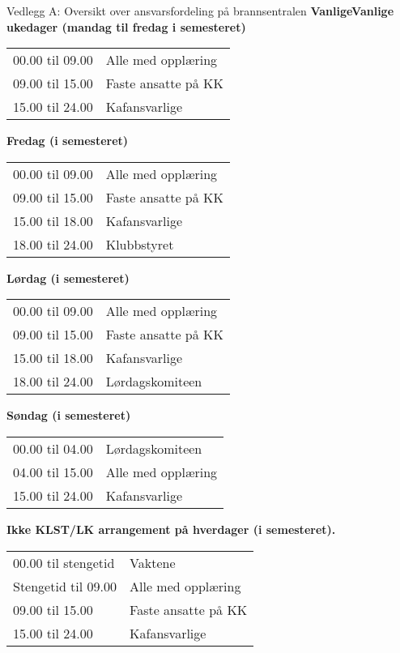 \begin{instruks}{Vedlegg A: Oversikt over ansvarsfordeling på brannsentralen}{}{}
    \textbf{VanligeVanlige ukedager (mandag til fredag i semesteret)}

    \begin{tabular}{ll}
        00.00 til 09.00 &    Alle med opplæring \\
        09.00 til 15.00 &    Faste ansatte på KK\\
        15.00 til 24.00 &    Kafansvarlige 
    \end{tabular}

    
    \textbf{Fredag (i semesteret)}
    
    \begin{tabular}{ll}
        00.00 til 09.00 &Alle med opplæring \\
        09.00 til 15.00 &Faste ansatte på KK\\
        15.00 til 18.00 &Kafansvarlige\\
        18.00 til 24.00 &Klubbstyret
    \end{tabular}

    
    \textbf{Lørdag (i semesteret)}
    
    
    \begin{tabular}{ll}
        00.00 til 09.00 &Alle med opplæring \\
        09.00 til 15.00 &Faste ansatte på KK\\
        15.00 til 18.00 &Kafansvarlige\\
        18.00 til 24.00 & Lørdagskomiteen
    \end{tabular}

    
    \textbf{Søndag (i semesteret)}
    
    
    \begin{tabular}{ll}
        00.00 til 04.00 &Lørdagskomiteen\\
        04.00 til 15.00 & Alle med opplæring\\
        15.00 til 24.00 & Kafansvarlige
    \end{tabular}

    
    \textbf{Ikke KLST/LK arrangement på hverdager (i semesteret).}
    
    
    \begin{tabular}{ll}
        00.00 til stengetid &    Vaktene\\
        Stengetid til 09.00 &    Alle med opplæring\\
        09.00 til 15.00 &     Faste ansatte på KK \\
        15.00 til 24.00 &     Kafansvarlige
    \end{tabular}


\end{instruks}
